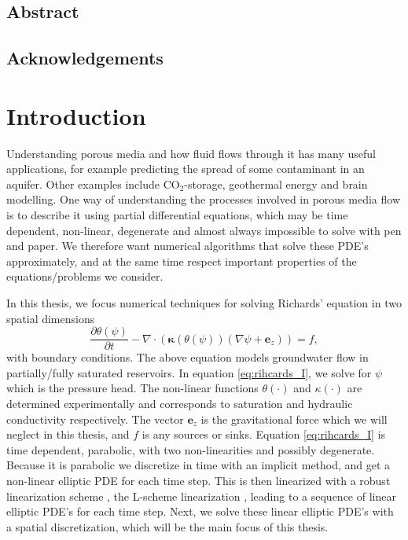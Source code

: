 \documentclass[../Main/main.tex]{subfiles}
\begin{document}
\section*{Abstract}
\markboth{}{}

\section*{Acknowledgements}

\chapter*{Introduction}
Understanding porous media and how fluid flows through it has many useful applications, for example predicting the spread of some contaminant in an aquifer. Other examples include $\text{CO}_2$-storage, geothermal energy and brain modelling. One way of understanding the processes involved in porous media flow is to describe it using partial differential equations, which may be time dependent, non-linear, degenerate and almost always impossible to solve with pen and paper. We therefore want numerical algorithms that solve these PDE's approximately, and at the same time respect important properties of the equations/problems we consider.\par
In this thesis, we focus numerical techniques for solving Richards' equation \cite{doi:10.1063/1.1745010} in two spatial dimensions
\begin{equation}\label{eq:rihcards_I}
	\frac{\partial \theta(\psi)}{\partial t} - \nabla \cdot (\bm{\kappa} (\theta (\psi))(\nabla \psi + \bm{e}_z)) = f,
\end{equation} 
with boundary conditions. The above equation models groundwater flow in partially/fully saturated reservoirs. In equation \eqref{eq:rihcards_I}, we solve for $\psi$ which is the pressure head. The non-linear functions $\theta(\cdot)$ and $\kappa(\cdot)$ are determined experimentally and corresponds to saturation and hydraulic conductivity respectively. The vector $\bm{e}_z$ is the gravitational force which we will neglect in this thesis, and $f$ is any sources or sinks.
Equation \eqref{eq:rihcards_I} is time dependent, parabolic, with two non-linearities and possibly degenerate. Because it is parabolic we discretize in time with an implicit method, and get a non-linear elliptic PDE for each time step. This is then linearized with a robust linearization scheme , the L-scheme linearization \cite{list2016study,10.1016/j.cam.2003.04.008}, leading to a sequence of linear elliptic PDE's for each time step. Next, we solve these linear elliptic PDE's with a spatial discretization, which will be the main focus of this thesis.
\end{document}
